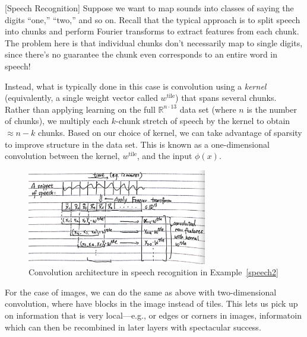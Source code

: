 \documentclass{article}
\begin{document}
\begin{example}
\label{speech2}
  [Speech Recognition]
  Suppose we want to map sounds into classes of saying the digits ``one,'' ``two,'' and so on. Recall that the typical approach is to split speech into chunks and perform Fourier transforms to extract features from each chunk.  The problem here is that individual chunks don't necessarily map to single digits, since there's no guarantee the chunk even corresponds to an entire word in speech!

  Instead, what is typically done in this case is convolution using a \emph{kernel} (equivalently, a single weight vector called $w^{\text{tile}}$) that spans several chunks.  Rather than applying learning on the full $\mathbb{R}^{n \cdot 13}$ data set (where $n$ is the number of chunks), we multiply each $k$-chunk stretch of speech by the kernel to obtain $\approx n - k$ chunks.  Based on our choice of kernel, we can take advantage of sparsity to improve structure in the data set.  This is known as a one-dimensional convolution between the kernel, $w^{\text{tile}}$, and the input $\phi(x)$.

    \begin{figure}[!ht]
    \centering
    \includegraphics[width = 0.7\textwidth]{speech2.jpg}
    \caption{Convolution architecture in speech recognition in Example~\ref{speech2}}
    \end{figure}
\end{example}

\begin{example}
  For the case of images, we can do the same as above with two-dimensional convolution, where have blocks in the image instead of tiles. This lets us pick up on information that is very local---e.g., or edges or corners in images, informatoin which can then be recombined in later layers with spectacular success.
\end{example}
\end{document}

